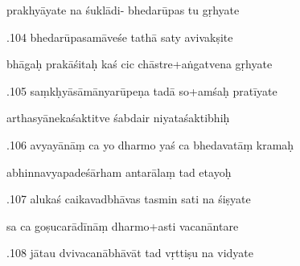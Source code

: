 \documentclass[article,12pt,a4paper]{memoir}%
\newcounter{parCount}
\begin{document}
	  
	  \pstart \leavevmode%
	prakhyāyate na śuklādi- bhedarūpas tu gṛhyate 
	{}
	\pend%
      

	  
	  \pstart {}.104 bhedarūpasamāveśe tathā saty avivakṣite 
	{}
	\pend%
      

	  
	  \pstart \leavevmode%
	bhāgaḥ prakāśitaḥ kaś cic chāstre+aṅgatvena gṛhyate 
	{}
	\pend%
      

	  
	  \pstart {}.105 saṃkḥyāsāmānyarūpeṇa tadā so+amśaḥ pratīyate 
	{}
	\pend%
      

	  
	  \pstart \leavevmode%
	arthasyānekaśaktitve śabdair niyataśaktibhiḥ 
	{}
	\pend%
      

	  
	  \pstart {}.106 avyayānāṃ ca yo dharmo yaś ca bhedavatāṃ kramaḥ 
	{}
	\pend%
      

	  
	  \pstart \leavevmode%
	abhinnavyapadeśārham antarālaṃ tad etayoḥ 
	{}
	\pend%
      

	  
	  \pstart {}.107 alukaś caikavadbhāvas tasmin sati na śiṣyate 
	{}
	\pend%
      

	  
	  \pstart \leavevmode%
	sa ca goṣucarādīnāṃ dharmo+asti vacanāntare 
	{}
	\pend%
      

	  
	  \pstart {}.108 jātau dvivacanābhāvāt tad vṛttiṣu na vidyate 
	{}
	\pend%
      
\end{document}
